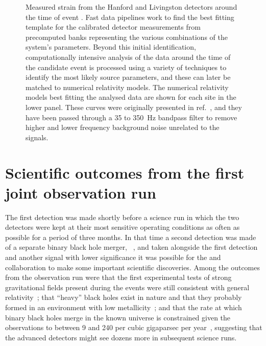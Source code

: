 \begin{figure}
  \centering
  
  \caption[Measured strain from the LIGO Hanford and Livingston detectors around the time of event \GWFIRSTEVENT{}]{\label{fig:gw150914}Measured strain from the \LIGO{} Hanford and Livingston detectors around the time of event \GWFIRSTEVENT{}. Fast data pipelines work to find the best fitting template for the calibrated detector measurements from precomputed banks representing the various combinations of the system's parameters. Beyond this initial identification, computationally intensive analysis of the data around the time of the candidate event is processed using a variety of techniques to identify the most likely source parameters, and these can later be matched to numerical relativity models. The numerical relativity models best fitting the analysed data are shown for each site in the lower panel. These curves were originally presented in ref.~\cite{Abbott2016}, and they have been passed through a \num{35} to \SI{350}{\hertz} bandpass filter to remove higher and lower frequency background noise unrelated to the signals.}
\end{figure}

\section{Scientific outcomes from the first joint observation run}
The first detection was made shortly before a science run in which the two \LIGO{} detectors were kept at their most sensitive operating conditions as often as possible for a period of three months. In that time a second detection was made of a separate binary black hole merger, \GWSECONDEVENT{}~\cite{Abbott2016b}, and taken alongside the first detection and another signal with lower significance it was possible for the \LSC{} and \VIRGO{} collaboration to make some important scientific discoveries. Among the outcomes from the observation run were that the first experimental tests of strong gravitational fields present during the events were still consistent with general relativity~\cite{Abbott2016c}; that ``heavy'' black holes exist in nature and that they probably formed in an environment with low metallicity~\cite{Abbott2016d}; and that the rate at which binary black holes merge in the known universe is constrained given the observations to between 9 and 240 per cubic gigaparsec per year~\cite{lscvirgoo1}, suggesting that the advanced detectors might see dozens more in subsequent science runs.

